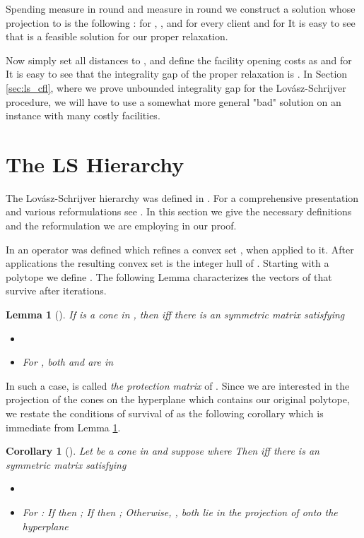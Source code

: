 \documentclass[11pt]{article}\usepackage{amsmath}
\newtheorem{lemma}{Lemma}[section]
\newtheorem{corollary}{Corollary}[section]
\begin{document}
Spending  measure in round  and  
measure in round  we construct a solution  whose projection to  is the 
following :
 for , , and for every client   and 
 for  It is easy to see that  is
a feasible solution for our proper relaxation.

Now simply set all distances to , and define the facility opening costs as 
 and  for  It is easy to see
that the integrality gap of the proper relaxation is . 
In Section \ref{sec:ls_cfl}, where we prove unbounded integrality gap for the
Lov\'{a}sz-Schrijver procedure, 
 we will have to use a somewhat more general "bad" solution on an instance with 
 many costly facilities.




\section{The LS Hierarchy}
\label{sec:ls}

The Lov\'{a}sz-Schrijver hierarchy was defined in \cite{LovaszS91}. For a 
comprehensive presentation and 
various reformulations see \cite{Tulsiani11-chapter}. In this section
we give the necessary definitions and the reformulation we are
employing in our proof. 

In \cite{LovaszS91} an operator  was defined which refines a convex set 
, when applied to  it.
After  applications the resulting convex set is the integer hull of . 
Starting with a polytope  we define
.
The following Lemma characterizes the vectors  of  
that survive  after  iterations.

\begin{lemma} [\cite{LovaszS91}]\label{lemmals}
 If  is a cone in , then  iff there is an  symmetric
matrix  satisfying
\begin{itemize}
\item[1.] 
\item[2.] For , both  and  are in 
\end{itemize}
\end{lemma}

In such a case,  is called \emph{the protection matrix} of . Since we are interested in
the projection of the cones on the hyperplane  which contains our
original polytope, we restate the conditions of survival of  as the following
corollary which is immediate from Lemma \ref{lemmals}.


\begin{corollary} [\cite{AroraBL02}]\label{corls}
 Let  be a cone in  and suppose  
where  Then  iff there
is an  symmetric matrix  satisfying

\begin{itemize}
\item[1.]  
\item[2.]  For : If  then ; 
If  then ; Otherwise, , 
both lie in the projection of  onto the hyperplane 
\end{itemize}
\end{corollary}
\end{document}
